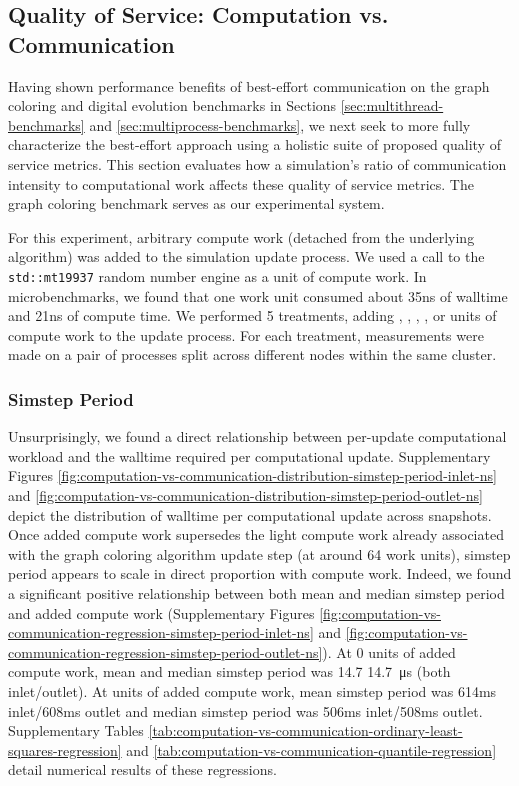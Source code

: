 \subsection{Quality of Service: Computation vs. Communication}
\label{sec:computation-vs-communication}

Having shown performance benefits of best-effort communication on the graph coloring and digital evolution benchmarks in Sections \ref{sec:multithread-benchmarks} and \ref{sec:multiprocess-benchmarks}, we next seek to more fully characterize the best-effort approach using a holistic suite of proposed quality of service metrics.
This section evaluates how a simulation's ratio of communication intensity to computational work affects these quality of service metrics.
The graph coloring benchmark serves as our experimental system.

For this experiment, arbitrary compute work (detached from the underlying algorithm) was added to the simulation update process.
We used a call to the \texttt{std::mt19937} random number engine as a unit of compute work.
In microbenchmarks, we found that one work unit consumed about 35ns of walltime and 21ns of compute time.
We performed 5 treatments, adding , , , , or  units of compute work to the update process.
For each treatment, measurements were made on a pair of processes split across different nodes within the same cluster.

\subsubsection{Simstep Period}

Unsurprisingly, we found a direct relationship between per-update computational workload and the walltime required per computational update.
Supplementary Figures \ref{fig:computation-vs-communication-distribution-simstep-period-inlet-ns} and \ref{fig:computation-vs-communication-distribution-simstep-period-outlet-ns} depict the distribution of walltime per computational update across snapshots.
Once added compute work supersedes the light compute work already associated with the graph coloring algorithm update step (at around 64 work units), simstep period appears to scale in direct proportion with compute work.
Indeed, we found a significant positive relationship between both mean and median simstep period and added compute work (Supplementary Figures \ref{fig:computation-vs-communication-regression-simstep-period-inlet-ns} and \ref{fig:computation-vs-communication-regression-simstep-period-outlet-ns}).
At 0 units of added compute work, mean and median simstep period was 14.7 \SI{14.7}{\micro\second} (both inlet/outlet).
At  units of added compute work, mean simstep period was 614ms inlet/608ms outlet and median simstep period was 506ms inlet/508ms outlet.
Supplementary Tables \ref{tab:computation-vs-communication-ordinary-least-squares-regression} and \ref{tab:computation-vs-communication-quantile-regression} detail numerical results of these regressions.

